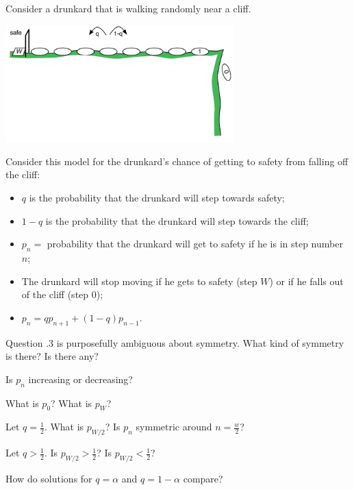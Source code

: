 \bookonlynewpage

\question \label{DE:drunkard}
	Consider a drunkard that is walking randomly near a cliff.

	\hfill \includegraphics*[width=250pt]{images/module26-drunk.pdf}
	\vspace{-70pt}

	\begin{minipage}{.9\textwidth}
		Consider this model for the drunkard's chance of getting to safety from falling off the cliff:
		\begin{itemize}
			\item $q$ is the probability that the drunkard will step towards safety;
			\item $1-q$ is the probability that the drunkard will step towards the cliff;
			\item $p_n=$ probability that the drunkard will get to safety if he is in step number $n$; 
			\item The drunkard will stop moving if he gets to safety (step $W$) or if he falls out of the cliff (step $0$); \\
	
			\item $p_n = q p_{n+1} + (1-q) p_{n-1}$. \\
		\end{itemize}
	\end{minipage}

	
\begin{annotation}
	\begin{goals}
		Question .3 is purposefully ambiguous about symmetry. What kind of symmetry is there? Is there any?
	\end{goals}
\end{annotation}
	\begin{parts}
		\item Is $p_n$ increasing or decreasing?
		\item What is $p_0$? What is $p_W$?
		\item Let $q=\frac12$. What is $p_{W/2}$? Is $p_n$ symmetric around $n=\frac{w}{2}$?
		\item Let $q>\frac12$. Is $p_{W/2} > \frac12$? Is $p_{W/2} < \frac12$? 
		\item How do solutions for $q=\alpha$ and $q=1-\alpha$ compare?
	\end{parts}


